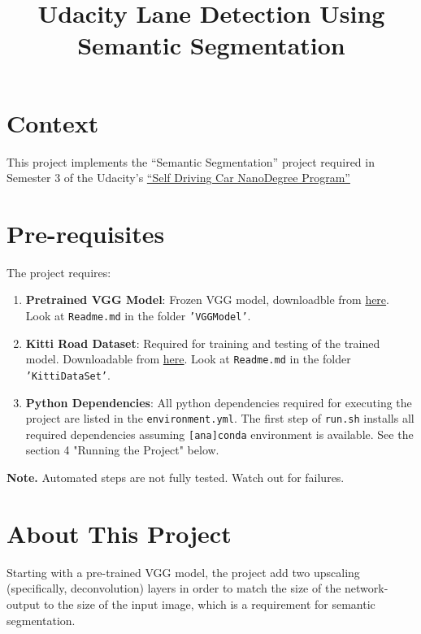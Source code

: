 \documentclass{article}
\title{Udacity Lane Detection Using Semantic Segmentation}
\date{\vspace{-5ex}}
\begin{document}
\maketitle


\section{Context}
This project implements the “Semantic Segmentation” project required in Semester 3 of the Udacity’s \href{https://de.udacity.com/course/self-driving-car-engineer-nanodegree--nd013}{“Self Driving Car NanoDegree Program”} 

\section{Pre-requisites}
The project requires:
\begin{enumerate}
\item \textbf{Pretrained VGG Model}: Frozen VGG model, downloadble from \href{https://s3-us-west-1.amazonaws.com/udacity-selfdrivingcar/vgg.zip}{here}. Look at \texttt{Readme.md} in the folder \texttt{'VGGModel'}.

\item \textbf{Kitti Road Dataset}: Required for training and testing of the trained model. Downloadable from 
\href{https://s3-us-west-1.amazonaws.com/udacity-selfdrivingcar/advanced\_deep\_learning/data\_road.zip}{here}. Look at \texttt{Readme.md} in the folder \\ \texttt{'KittiDataSet'}.

\item \textbf{Python Dependencies}: All python dependencies required for executing the project are listed in the \texttt{environment.yml}. The first step of \texttt{run.sh} installs all required dependencies assuming \texttt{[ana]conda} environment is available. See the section 4 "Running the Project" below.
\end{enumerate}

\textbf{Note. }Automated steps are not fully tested. Watch out for failures.

\section{About This Project}
Starting with a pre-trained VGG model, the project add two upscaling (specifically, deconvolution) layers in order to match the size of the network-output to the size of the input image, which is a requirement for semantic segmentation. 
\end{document}
